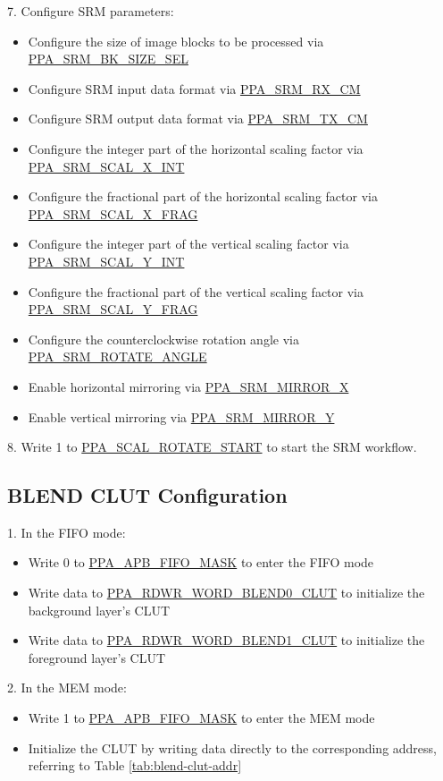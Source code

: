 \documentclass[main\_\_EN.tex]{subfiles}
\begin{document}
7. Configure SRM parameters:
\begin{itemize}
    \item Configure the size of image blocks to be processed via \hyperref[fielddesc:PPASRMBKSIZESEL]{PPA\_SRM\_BK\_SIZE\_SEL}
    \item Configure SRM input data format via \hyperref[fielddesc:PPASRMRXCM]{PPA\_SRM\_RX\_CM}
    \item Configure SRM output data format via \hyperref[fielddesc:PPASRMTXCM]{PPA\_SRM\_TX\_CM}
    \item Configure the integer part of the horizontal scaling factor via \hyperref[fielddesc:PPASRMSCALXINT]{PPA\_SRM\_SCAL\_X\_INT}
    \item Configure the fractional part of the horizontal scaling factor via \hyperref[fielddesc:PPASRMSCALXFRAG]{PPA\_SRM\_SCAL\_X\_FRAG}
    \item Configure the integer part of the vertical scaling factor via \hyperref[fielddesc:PPASRMSCALYINT]{PPA\_SRM\_SCAL\_Y\_INT}
    \item Configure the fractional part of the vertical scaling factor via \hyperref[fielddesc:PPASRMSCALYFRAG]{PPA\_SRM\_SCAL\_Y\_FRAG}
    \item Configure the counterclockwise rotation angle via \hyperref[fielddesc:PPASRMROTATEANGLE]{PPA\_SRM\_ROTATE\_ANGLE}
    \item Enable horizontal mirroring via \hyperref[fielddesc:PPASRMMIRRORX]{PPA\_SRM\_MIRROR\_X}
    \item Enable vertical mirroring via \hyperref[fielddesc:PPASRMMIRRORY]{PPA\_SRM\_MIRROR\_Y}
\end{itemize}

8. Write 1 to \hyperref[fielddesc:PPASCALROTATESTART]{PPA\_SCAL\_ROTATE\_START} to start the SRM workflow.

\subsection{BLEND CLUT Configuration}
\label{sec: ppa_blend_clut_config}
1. In the FIFO mode:
\begin{itemize}
    \item Write 0 to \hyperref[fielddesc:PPAAPBFIFOMASK]{PPA\_APB\_FIFO\_MASK} to enter the FIFO mode
    \item Write data to \hyperref[fielddesc:PPARDWRWORDBLEND0CLUT]{PPA\_RDWR\_WORD\_BLEND0\_CLUT} to initialize the background layer's CLUT
    \item Write data to \hyperref[fielddesc:PPARDWRWORDBLEND1CLUT]{PPA\_RDWR\_WORD\_BLEND1\_CLUT} to initialize the foreground layer's CLUT
\end{itemize}
2. In the MEM mode:
\begin{itemize}
    \item Write 1 to \hyperref[fielddesc:PPAAPBFIFOMASK]{PPA\_APB\_FIFO\_MASK} to enter the MEM mode
    \item Initialize the CLUT by writing data directly to the corresponding address, referring to Table \ref{tab:blend-clut-addr}
\end{itemize}
\end{document}
